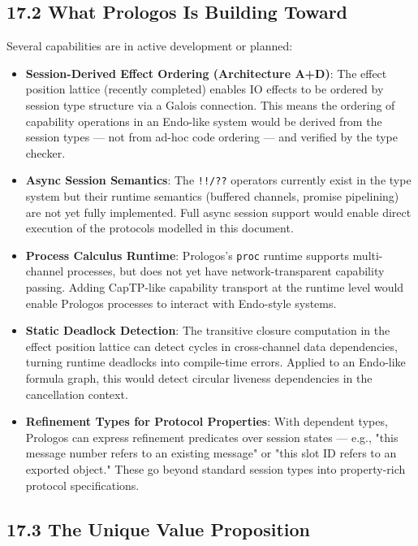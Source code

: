 \documentclass[11pt]{article}
\begin{document}
\subsection{17.2 What Prologos Is Building Toward}
\label{sec:org46a977d}

Several capabilities are in active development or planned:

\begin{itemize}
\item \textbf{Session-Derived Effect Ordering (Architecture A+D)}: The effect position
lattice (recently completed) enables IO effects to be ordered by session
type structure via a Galois connection. This means the ordering of
capability operations in an Endo-like system would be derived from the
session types --- not from ad-hoc code ordering --- and verified by the
type checker.

\item \textbf{Async Session Semantics}: The \texttt{!!/??} operators currently exist in the
type system but their runtime semantics (buffered channels, promise
pipelining) are not yet fully implemented. Full async session support
would enable direct execution of the protocols modelled in this document.

\item \textbf{Process Calculus Runtime}: Prologos's \texttt{proc} runtime supports
multi-channel processes, but does not yet have network-transparent
capability passing. Adding CapTP-like capability transport at the runtime
level would enable Prologos processes to interact with Endo-style systems.

\item \textbf{Static Deadlock Detection}: The transitive closure computation in the
effect position lattice can detect cycles in cross-channel data
dependencies, turning runtime deadlocks into compile-time errors. Applied
to an Endo-like formula graph, this would detect circular liveness
dependencies in the cancellation context.

\item \textbf{Refinement Types for Protocol Properties}: With dependent types, Prologos
can express refinement predicates over session states --- e.g., "this
message number refers to an existing message" or "this slot ID refers to
an exported object." These go beyond standard session types into
property-rich protocol specifications.
\end{itemize}
\subsection{17.3 The Unique Value Proposition}
\label{sec:org7ff045a}
\end{document}
